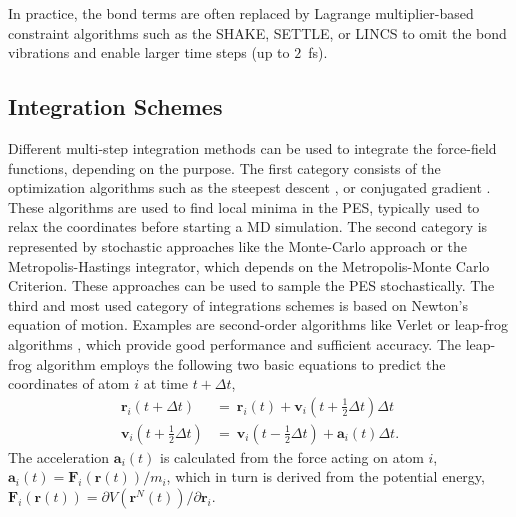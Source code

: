 In practice, the bond terms are often replaced by Lagrange multiplier-based constraint algorithms such as the SHAKE\cite{Ryckaert1977, Ciccotti1986}, SETTLE,\cite{Miyamoto1992} or LINCS\cite{Hess1997} to omit the bond vibrations and enable larger time steps (up to $2$~fs). \cite{Ryckaert1977}


\subsection{Integration Schemes}
Different multi-step integration methods can be used to integrate the force-field functions, depending on the purpose. 
%
The first category consists of the optimization algorithms such as the steepest descent \cite{Debye1909}, or conjugated gradient \cite{Hestenes1952}. These algorithms are used to find local minima in the PES, typically used to relax the coordinates before starting a MD simulation.\cite{Cazals2015}
The second category is represented by stochastic approaches like the Monte-Carlo approach or the Metropolis-Hastings integrator\cite{Hastings1970}, which depends on the Metropolis-Monte Carlo Criterion\cite{Metropolis1953}. These approaches can be used to sample the PES stochastically. 
The third and most used category of integrations schemes is based on Newton's equation of motion\cite{Newton1726, Cohen1999}. 
Examples are second-order algorithms like Verlet or leap-frog algorithms \cite{Hockney1970}, which provide good performance and sufficient accuracy.\cite{Gunsteren1990, Leimkuhler1996}
The leap-frog algorithm employs the following two basic equations to predict the coordinates of atom $i$ at time $t+ \Delta t$,
\begin{equation}
    \begin{split}
        \textbf{r}_i(t+\Delta t)&=~\textbf{r}_i(t)+\textbf{v}_i(t+\frac{1}{2} \Delta t) \Delta t \\
        \textbf{v}_i(t+\frac{1}{2} \Delta t)&=~\textbf{v}_i(t - \frac{1}{2} \Delta t)+\textbf{a}_i(t) \Delta t.
    \end{split}
\end{equation}
The acceleration $\textbf{a}_i(t)$ is calculated from the force acting on atom $i$, $\textbf{a}_i(t) = \textbf{F}_i(\textbf{r}(t))/m_i$, which in turn is derived from the potential energy, $\textbf{F}_i(\textbf{r}(t)) = \partial V(\textbf{r}^N(t))/ \partial \textbf{r}_i$.\cite{Gunsteren1990}

